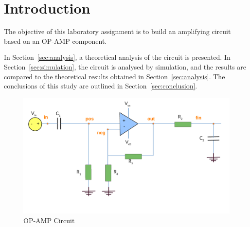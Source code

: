 \section{Introduction}
\label{sec:introduction}

The objective of this laboratory assignment is to build an amplifying circuit based on an OP-AMP component.

In Section~\ref{sec:analysis}, a theoretical analysis of the circuit is
presented. In Section~\ref{sec:simulation}, the circuit is analysed by
simulation, and the results are compared to the theoretical results obtained in
Section~\ref{sec:analysis}. The conclusions of this study are outlined in
Section~\ref{sec:conclusion}.

\begin{figure}[H] \centering
\includegraphics[width=1\linewidth]{../t5circuit.pdf}
\caption{OP-AMP Circuit}
\label{fig:t5}
\end{figure}


